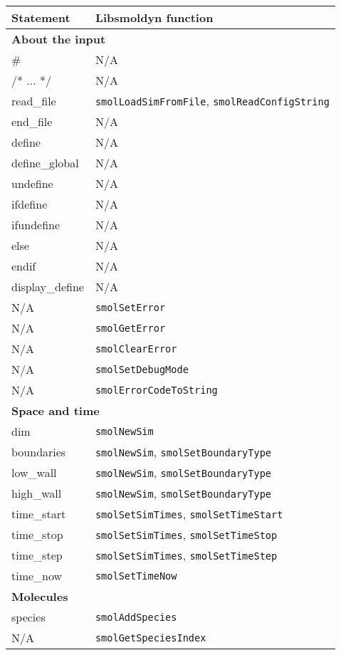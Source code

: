 \documentclass {book}
\begin{document}
\begin{longtable}[c]{ll}
Statement & Libsmoldyn function\\
\hline
\multicolumn{2}{l}{\hspace{0.3in}\textbf{About the input}}\\
\hline
\# & N/A\\
/* ... */ & N/A\\
read\_file & \texttt{smolLoadSimFromFile}, \texttt{smolReadConfigString}\\
end\_file & N/A\\
define & N/A\\
define\_global & N/A\\
undefine & N/A\\
ifdefine & N/A\\
ifundefine & N/A\\
else & N/A\\
endif & N/A\\
display\_define & N/A\\
N/A & \texttt{smolSetError}\\
N/A & \texttt{smolGetError}\\
N/A & \texttt{smolClearError}\\
N/A & \texttt{smolSetDebugMode}\\
N/A & \texttt{smolErrorCodeToString}\\
\hline
\multicolumn{2}{l}{\hspace{0.3in}\textbf{Space and time}}\\
\hline
dim & \texttt{smolNewSim}\\
boundaries & \texttt{smolNewSim}, \texttt{smolSetBoundaryType}\\
low\_wall & \texttt{smolNewSim}, \texttt{smolSetBoundaryType}\\
high\_wall & \texttt{smolNewSim}, \texttt{smolSetBoundaryType}\\
time\_start & \texttt{smolSetSimTimes}, \texttt{smolSetTimeStart}\\
time\_stop & \texttt{smolSetSimTimes}, \texttt{smolSetTimeStop}\\
time\_step & \texttt{smolSetSimTimes}, \texttt{smolSetTimeStep}\\
time\_now & \texttt{smolSetTimeNow}\\
\hline
\multicolumn{2}{l}{\hspace{0.3in}\textbf{Molecules}}\\
\hline
species & \texttt{smolAddSpecies}\\
N/A & \texttt{smolGetSpeciesIndex}\\

\end{longtable}
\end{document}
